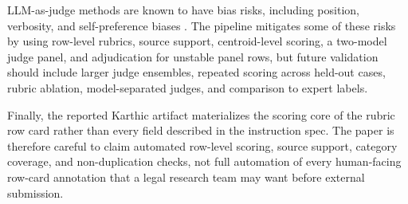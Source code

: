 LLM-as-judge methods are known to have bias risks, including position,
verbosity, and self-preference biases
\cite{zheng2023judging,shi2024positionbias,wataoka2024selfpreference}. The
pipeline mitigates some of these risks by using row-level rubrics, source
support, centroid-level scoring, a two-model judge panel, and adjudication for
unstable panel rows, but future validation should include larger judge
ensembles, repeated scoring across held-out cases, rubric ablation,
model-separated judges, and comparison to expert labels.

Finally, the reported Karthic artifact materializes the scoring core of the
rubric row card rather than every field described in the instruction spec. The
paper is therefore careful to claim automated row-level scoring, source support,
category coverage, and non-duplication checks, not full automation of every
human-facing row-card annotation that a legal research team may want before
external submission.
